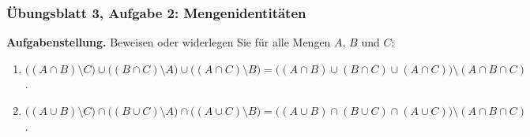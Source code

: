 \subsubsection*{Übungsblatt 3, Aufgabe 2: Mengenidentitäten}

\noindent\textbf{Aufgabenstellung.}
Beweisen oder widerlegen Sie für alle Mengen $A$, $B$ und $C$:
\begin{enumerate}
    \item $\bigl((A\cap B)\setminus C\bigr)\cup\bigl((B\cap C)\setminus A\bigr)\cup\bigl((A\cap C)\setminus B\bigr)
    = \bigl((A\cap B)\cup(B\cap C)\cup(A\cap C)\bigr)\setminus(A\cap B\cap C)$.
    \item $\bigl((A\cup B)\setminus C\bigr)\cap\bigl((B\cup C)\setminus A\bigr)\cap\bigl((A\cup C)\setminus B\bigr)
    = \bigl((A\cup B)\cap(B\cup C)\cap(A\cup C)\bigr)\setminus(A\cap B\cap C)$.
\end{enumerate}

